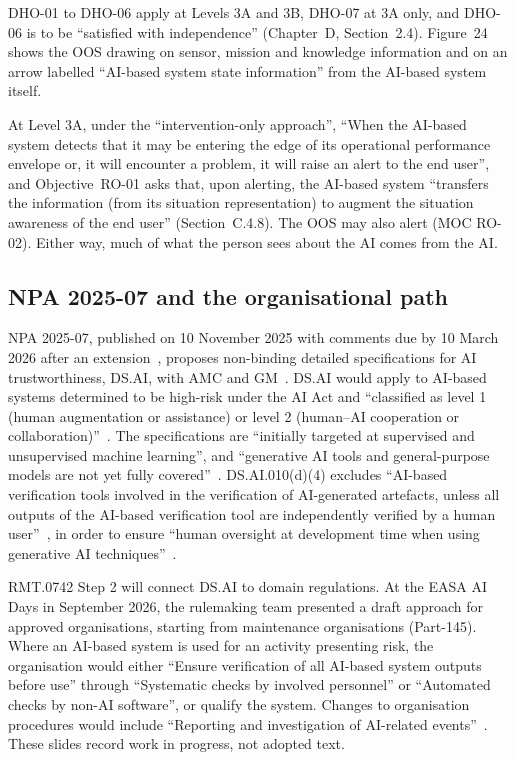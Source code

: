 \documentclass[11pt]{article}
\begin{document}
DHO-01 to DHO-06 apply at Levels 3A and 3B, DHO-07 at 3A only, and DHO-06 is to be ``satisfied with independence'' (Chapter~D, Section~2.4). Figure~24 shows the OOS drawing on sensor, mission and knowledge information and on an arrow labelled ``AI-based system state information'' from the AI-based system itself.

At Level 3A, under the ``intervention-only approach'', ``When the AI-based system detects that it may be entering the edge of its operational performance envelope or, it will encounter a problem, it will raise an alert to the end user'', and Objective~RO-01 asks that, upon alerting, the AI-based system ``transfers the information (from its situation representation) to augment the situation awareness of the end user'' (Section~C.4.8). The OOS may also alert (MOC RO-02). Either way, much of what the person sees about the AI comes from the AI.

\subsection{NPA 2025-07 and the organisational path}\label{sec:npa}

NPA 2025-07, published on 10 November 2025 with comments due by 10 March 2026 after an extension~\cite{easa2025npaweb}, proposes non-binding detailed specifications for AI trustworthiness, DS.AI, with AMC and GM~\cite{easa2025npaA,easa2025npaB}. DS.AI would apply to AI-based systems determined to be high-risk under the AI Act and ``classified as level 1 (human augmentation or assistance) or level 2 (human--AI cooperation or collaboration)''~\cite[DS.AI.010(c)]{easa2025npaB}. The specifications are ``initially targeted at supervised and unsupervised machine learning'', and ``generative AI tools and general-purpose models are not yet fully covered''~\cite[Sections~2.3 and~3]{easa2025npaA}. DS.AI.010(d)(4) excludes ``AI-based verification tools involved in the verification of AI-generated artefacts, unless all outputs of the AI-based verification tool are independently verified by a human user''~\cite{easa2025npaB}, in order to ensure ``human oversight at development time when using generative AI techniques''~\cite[Section~2.3]{easa2025npaA}.

RMT.0742 Step 2 will connect DS.AI to domain regulations. At the EASA AI Days in September 2026, the rulemaking team presented a draft approach for approved organisations, starting from maintenance organisations (Part-145). Where an AI-based system is used for an activity presenting risk, the organisation would either ``Ensure verification of all AI-based system outputs before use'' through ``Systematic checks by involved personnel'' or ``Automated checks by non-AI software'', or qualify the system. Changes to organisation procedures would include ``Reporting and investigation of AI-related events''~\cite[slides~25 and~26]{easa2026aidays}. These slides record work in progress, not adopted text.
\end{document}
